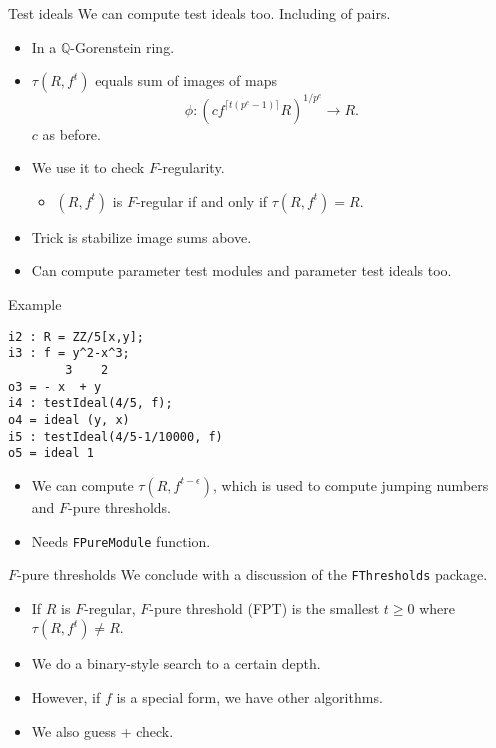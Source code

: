 \documentclass[xcolor=dvipsnames]{beamer}
\newcommand{\bQ}{\mathbb{Q}}
\theoremstyle{remark}
\begin{document}
\begin{frame}[c]{Test ideals}
    We can compute test ideals too.  Including of pairs.
    \begin{itemize}
        \item<2-> In a $\bQ$-Gorenstein ring.
        \item<3-> $\tau(R, f^t)$ equals sum of images of maps
        \[
        \phi : (cf^{\lceil t(p^e - 1)\rceil} R)^{1/p^e} \to R.
        \]
        $c$ as before.
        \item<4->  We use it to check $F$-regularity.
        \begin{itemize}
            \item<5->  $(R, f^t)$ is $F$-regular if and only if $\tau(R, f^t) = R$.
        \end{itemize}
        \item<6->  Trick is stabilize image sums above.
        \item<7->  Can compute parameter test modules and parameter test ideals too.
    \end{itemize}
\end{frame}


\begin{frame}[fragile]{Example}
\begin{verbatim}
i2 : R = ZZ/5[x,y];
i3 : f = y^2-x^3;
        3    2
o3 = - x  + y
i4 : testIdeal(4/5, f);
o4 = ideal (y, x)
i5 : testIdeal(4/5-1/10000, f)
o5 = ideal 1
\end{verbatim}
\begin{itemize}
\item<2->We can compute $\tau(R, f^{t-\epsilon})$, which is used to compute jumping numbers and $F$-pure thresholds.
\item<3->Needs {\tt FPureModule} function.
\end{itemize}
\end{frame}


\begin{frame}[fragile]{$F$-pure thresholds}
    We conclude with a discussion of the {\tt FThresholds} package.
    \begin{itemize}
        \item<2->  If $R$ is $F$-regular, $F$-pure threshold (FPT) is the smallest $t \geq 0$ where $\tau(R, f^t) \neq R$.
        \item<3->  We do a binary-style search to a certain depth.
        \item<4->  However, if $f$ is a special form, we have other algorithms.
        \item<5->  We also guess + check.
    \end{itemize}
\end{frame}
\end{document}
